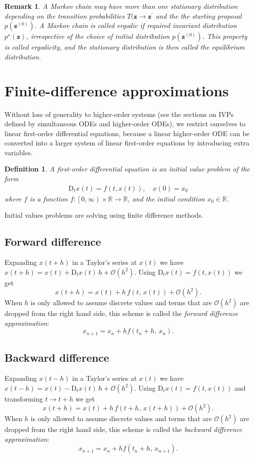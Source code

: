 \documentclass[11pt]{article}
\newtheorem{definition}{Definition}
\newtheorem*{remark}{Remark}
\begin{document}
\begin{remark}
A Markov chain may have more than one stationary distribution depending on the transition probabilities \(T(\mathbf{z} \to \mathbf{z}^{\prime}\) and the the starting proposal \(p(\mathbf{z}^{(0)})\). A Markov chain is called \emph{ergodic} if required invariant distribution \(p^{\star}(\mathbf{z})\), irrespective of the choice of initial distribution \(p(\mathbf{z}^{(0)})\). This property is called \emph{ergodicity}, and the stationary distribution is then called the \emph{equilibrium distribution}.
\label{orgabfa7d4}
\end{remark}
\section*{Finite-difference approximations}
\label{sec:org1018c40}
Without loss of generality to higher-order systems (see the sections on IVPs defined by simultaneous ODEs and higher-order ODEs), we restrict ourselves to linear first-order differential equations, because a linear higher-order ODE can be converted into a larger system of linear first-order equations by introducing extra variables. 

\begin{definition}
A first-order differential equation is an initial value problem of the form
\begin{align*}
\mathrm{D}_t x(t) = f(t, x(t)), \quad x\left(0\right)=x_0
\end{align*}
where \(f\) is a function \(f:\left[0, \infty\right) \times \mathbb{R} \rightarrow \mathbb{R}\), and the initial condition \(x_0 \in \mathbb{R}\).
\label{orgb96ec21}
\end{definition}
Initial values problems are solving using finite difference methods.
\subsection*{Forward difference}
\label{sec:org85b66b9}
Expanding \(x(t + h)\) in a Taylor's series at \(x (t)\) we have \(x(t + h) = x(t) + \mathrm{D}_t x(t) \, h + \mathcal{O} (h^{2})\). Using \(\mathrm{D}_t x(t) = f(t, x(t))\) we get
\[
\boxed{
x(t+h) = x(t) + h \, f(t,\,x(t))  + \mathcal{O} (h^{2}).
}
\]
When \(h\) is only allowed to assume discrete values and terms that are \(\mathcal{O} (h^{2})\) are dropped from the right hand side, this scheme is called the \emph{forward difference approximation}:
\[
\boxed{
x_{n+1} = x_{n} + h f(t_n + h,\, x_{n}).
}
\]
\subsection*{Backward difference}
\label{sec:org9b73712}
Expanding \(x(t - h)\) in a Taylor's series at \(x (t)\) we have \(x(t- h) = x(t) - \mathrm{D}_t x(t) \, h + \mathcal{O} (h^{2})\). Using \(\mathrm{D}_t x(t) = f(t, x(t))\) and transforming \(t \to t + h\) we get
\[
\boxed{
x(t+h) = x(t) + h \, f(t+h,\,x(t+h))  + \mathcal{O} (h^{2}).
}
\]
When \(h\) is only allowed to assume discrete values and terms that are \(\mathcal{O} (h^{2})\) are dropped from the right hand side, this scheme is called the \emph{backward difference approximation}:
\[
\boxed{
x_{n+1} = x_{n} + h f(t_n + h,\, x_{n+1}).
}
\]
\end{document}
